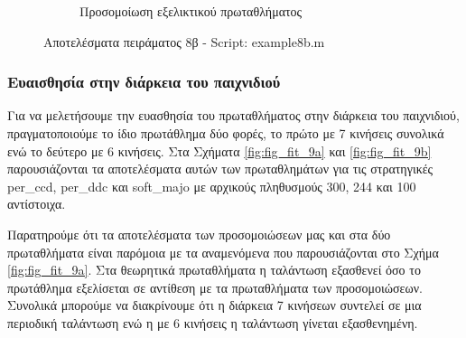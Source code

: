 \documentclass[12pt]{report}
\begin{document}
\begin{figure}[htbp]
\begin{subfigure}[b]{0.5\linewidth}
        \caption{Προσομοίωση εξελικτικού πρωταθλήματος}
        \label{fig:fig_fit_8b_c}
        
    \end{subfigure}

    \caption{Αποτελέσματα πειράματος 8β - \foreignlanguage{english}{Script: example8b.m}}
    \label{fig:fig_fit_8b}
\end{figure}

\subsubsection{Ευαισθησία στην διάρκεια του παιχνιδιού}
Για να μελετήσουμε την ευασθησία του πρωταθλήματος στην διάρκεια του παιχνιδιού, πραγματοποιούμε το ίδιο πρωτάθλημα δύο φορές, το πρώτο με 7 κινήσεις συνολικά ενώ το δεύτερο με 6 κινήσεις. Στα Σχήματα \ref{fig:fig_fit_9a} και \ref{fig:fig_fit_9b} παρουσιάζονται τα αποτελέσματα αυτών των πρωταθλημάτων για τις στρατηγικές \foreignlanguage{english}{per\_ccd, per\_ddc} και \foreignlanguage{english}{soft\_majo} με αρχικούς πληθυσμούς 300, 244 και 100 αντίστοιχα.

Παρατηρούμε ότι τα αποτελέσματα των προσομοιώσεων μας και στα δύο πρωταθλήματα είναι παρόμοια με τα αναμενόμενα που παρουσιάζονται στο Σχήμα \ref{fig:fig_fit_9a}. Στα θεωρητικά πρωταθλήματα η ταλάντωση εξασθενεί όσο το πρωτάθλημα εξελίσεται σε αντίθεση με τα πρωταθλήματα των προσομοιώσεων. Συνολικά μπορούμε να διακρίνουμε ότι η διάρκεια 7 κινήσεων συντελεί σε μια περιοδική ταλάντωση ενώ η με 6 κινήσεις η ταλάντωση γίνεται εξασθενημένη.
\end{document}
